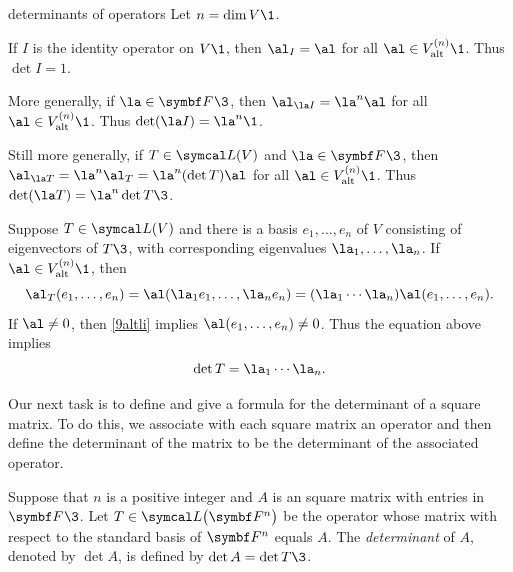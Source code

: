 \begin{example}[9detops]{determinants of operators}
Let $n = \dim V\1$.
\begin{Itemize} \addtolength{\itemsep}{-.014in} %
\item
If $I$ is the identity operator on $V\1$, then $\al_I = \al$ for all $\al \in V_{\text{alt}}^{(n)}\1$. Thus $\det I = 1$.

\item
More generally, if $\la \in \F{}\3$, then $\al_{\la I} = \la^n \al$ for all $\al \in V_{\text{alt}}^{(n)}\1$. Thus
$\det (\la I )= \la^n\1$.

\item
Still more generally, if $T \in \L(V)$ and $\la \in \F{}\3$, then $\al_{\la T} = \la^n \al_T = \la^n (\det T) \al$ for all
$\al \in V_{\text{alt}}^{(n)}\1$. Thus $\det (\la T) = \la^n \det T\3$.

\item
Suppose $T \in \L(V)$ and there is a basis $e_1, \ldots, e_n$ of $V$ consisting of eigenvectors of $T\3$, with corresponding eigenvalues $\la_1, \ldots, \la_n$. If $\al \in V_{\text{alt}}^{(n)}\1$, then%
\[
\al_T(e_1, \ldots, e_n) = \al(\la_1 e_1, \ldots, \la_n e_n) = (\la_1 \cdots \la_n) \al(e_1, \ldots, e_n).
\]
If $\al \ne 0$, then \ref{9altli} implies $\al(e_1, \ldots, e_n) \ne 0$. Thus the equation above implies
\[
\det T = \la_1 \cdots \la_n.
\]
\end{Itemize}
\exampleitemend
\end{example}

\pagebreak[3]

Our next task is to define and give a formula for the determinant of a square matrix. To do this, we associate with each square matrix an operator and then define the determinant of the matrix to be the determinant of the associated operator.

{Suppose that $n$ is a positive integer and $A$ is an  square matrix with entries in~$\F{}\3$. Let
$T \in \L\paren[\big]{\F n}$ be the operator whose matrix with respect to the standard basis of $\F n$ equals $A$. The \emph{determinant} of $A$, denoted by $\det A$, is defined by $\det A = \det T\3$.}

